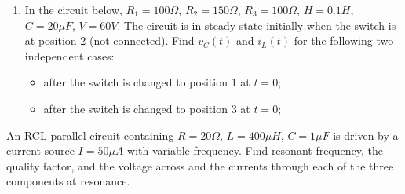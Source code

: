 \begin{enumerate}
\item In the circuit below, $R_1=100\Omega$, $R_2=150\Omega$, $R_3=100\Omega$,
  $H=0.1H$, $C=20\mu F$, $V=60V$. The circuit is in steady state initially when 
  the switch is at position 2 (not connected). Find $v_C(t)$ and $i_L(t)$ for the 
  following two independent cases:
  \begin{itemize}
    \item after the switch is changed to position 1 at $t=0$;
    \item after the switch is changed to position 3 at $t=0$;
  \end{itemize}
  




\end{enumerate}



\item An RCL parallel circuit containing $R=20\Omega$, $L=400 \mu H$,
$C=1 \mu F$ is driven by a current source $I=50 \mu A$ with variable 
frequency. Find resonant frequency, the quality factor, and the voltage
across and the currents through each of the three components at resonance.

% 
 
